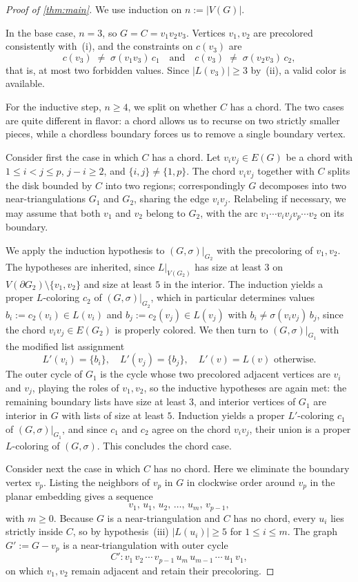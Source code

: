 \documentclass[10pt,a4paper]{amsart}
\newcommand{\E}{E}
\newcommand{\Gs}{(G,\sigma)}
\newcommand{\V}{V}
\begin{document}
\begin{proof}[Proof of \cref{thm:main}]
We use induction on $n:=|\V(G)|$.

In the base case, $n=3$, so $G=C=v_1v_2v_3$. Vertices $v_1,v_2$ are
precolored consistently with~(i), and the constraints on $c(v_3)$
are
\[
c(v_3)\;\ne\;\sigma(v_1v_3)\,c_1
\quad\text{and}\quad
c(v_3)\;\ne\;\sigma(v_2v_3)\,c_2,
\]
that is, at most two forbidden values. Since $|L(v_3)|\ge 3$
by~(ii), a valid color is available.

For the inductive step, $n\ge 4$, we split on whether $C$ has a
chord. The two cases are quite different in flavor: a chord allows
us to recurse on two strictly smaller pieces, while a chordless
boundary forces us to remove a single boundary vertex.

Consider first the case in which $C$ has a chord. Let
$v_iv_j\in\E(G)$ be a chord with $1\le i<j\le p$, $j-i\ge 2$, and
$\{i,j\}\ne\{1,p\}$. The chord $v_iv_j$ together with $C$ splits
the disk bounded by $C$ into two regions; correspondingly $G$
decomposes into two near-triangulations $G_1$ and $G_2$, sharing
the edge $v_iv_j$. Relabeling if necessary, we may assume that
both $v_1$ and $v_2$ belong to $G_2$, with the arc
$v_1\cdots v_iv_jv_p\cdots v_2$ on its boundary.

We apply the induction hypothesis to $\Gs|_{G_2}$ with the
precoloring of $v_1,v_2$. The hypotheses are inherited, since
$L|_{V(G_2)}$ has size at least $3$ on
$\V(\partial G_2)\setminus\{v_1,v_2\}$ and size at least $5$ in the
interior. The induction yields a proper $L$-coloring $c_2$ of
$\Gs|_{G_2}$, which in particular determines values
$b_i:=c_2(v_i)\in L(v_i)$ and $b_j:=c_2(v_j)\in L(v_j)$ with
$b_i\ne\sigma(v_iv_j)\,b_j$, since the chord $v_iv_j\in\E(G_2)$ is
properly colored. We then turn to $\Gs|_{G_1}$ with the modified
list assignment
\[
   L'(v_i)=\{b_i\},\quad L'(v_j)=\{b_j\},\quad
   L'(v)=L(v)\text{ otherwise.}
\]
The outer cycle of $G_1$ is the cycle whose two precolored adjacent
vertices are $v_i$ and $v_j$, playing the roles of $v_1,v_2$, so
the inductive hypotheses are again met: the remaining boundary
lists have size at least $3$, and interior vertices of $G_1$ are
interior in $G$ with lists of size at least $5$. Induction yields a
proper $L'$-coloring $c_1$ of $\Gs|_{G_1}$, and since $c_1$ and
$c_2$ agree on the chord $v_iv_j$, their union is a proper
$L$-coloring of $\Gs$. This concludes the chord case.

Consider next the case in which $C$ has no chord. Here we
eliminate the boundary vertex $v_p$. Listing the neighbors of $v_p$
in $G$ in clockwise order around $v_p$ in the planar embedding
gives a sequence
\[
v_1,\,u_1,\,u_2,\,\dots,\,u_m,\,v_{p-1},
\]
with $m\ge 0$. Because $G$ is a near-triangulation and $C$ has no
chord, every $u_i$ lies strictly inside $C$, so by hypothesis~(iii)
$|L(u_i)|\ge 5$ for $1\le i\le m$. The graph $G':=G-v_p$ is a
near-triangulation with outer cycle
\[
   C'\colon v_1\,v_2\,\cdots\,v_{p-1}\,u_m\,u_{m-1}\,\cdots\,u_1\,v_1,
\]
on which $v_1,v_2$ remain adjacent and retain their precoloring.


\end{proof}
\end{document}
